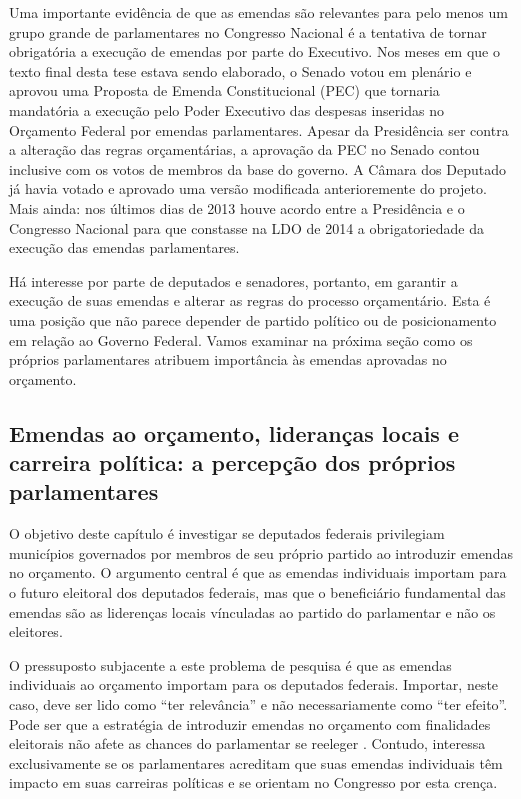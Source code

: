 Uma importante evidência de que as emendas são relevantes para pelo menos um grupo grande de parlamentares no Congresso Nacional é a tentativa de tornar obrigatória a execução de emendas por parte do Executivo. Nos meses em que o texto final desta tese estava sendo elaborado, o Senado votou em plenário e aprovou uma Proposta de Emenda Constitucional (PEC) que tornaria mandatória a execução pelo Poder Executivo das despesas inseridas no Orçamento Federal por emendas parlamentares. Apesar da Presidência ser contra a alteração das regras orçamentárias, a aprovação da PEC no Senado contou inclusive com os votos de membros da base do governo. A Câmara dos Deputado já havia votado e aprovado uma versão modificada anterioremente do projeto. Mais ainda: nos últimos dias de 2013 houve acordo entre a Presidência e o Congresso Nacional para que constasse na LDO de 2014 a obrigatoriedade da execução das emendas parlamentares.

Há interesse por parte de deputados e senadores, portanto, em garantir a execução de suas emendas e alterar as regras do processo orçamentário. Esta é uma posição que não parece depender de partido político ou de posicionamento em relação ao Governo Federal. Vamos examinar na próxima seção como os próprios parlamentares atribuem importância às emendas aprovadas no orçamento.

\subsection{Emendas ao orçamento, lideranças locais e carreira política: a percepção dos próprios parlamentares}

O objetivo deste capítulo é investigar se deputados federais privilegiam municípios governados por membros de seu próprio partido ao introduzir emendas no orçamento. O argumento central é que as emendas individuais importam para o futuro eleitoral dos deputados federais, mas que o beneficiário fundamental das emendas são as liderenças locais vínculadas ao partido do parlamentar e não os eleitores.

O pressuposto subjacente a este problema de pesquisa é que as emendas individuais ao orçamento importam para os deputados federais. Importar, neste caso, deve ser lido como ``ter relevância'' e não necessariamente como ``ter efeito''. Pode ser que a estratégia de introduzir emendas no orçamento com finalidades eleitorais não afete as chances do parlamentar se reeleger \citep{Mesquita2008}. Contudo, interessa exclusivamente se os parlamentares acreditam que suas emendas individuais têm impacto em suas carreiras políticas e se orientam no Congresso por esta crença.


